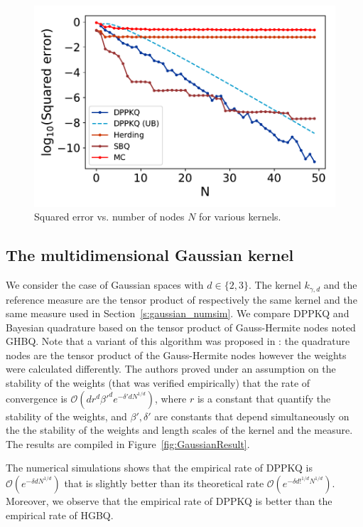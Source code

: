 \documentclass[twoside,11pt]{book}
\numberwithin{theorem}{chapter}
\numberwithin{definition}{chapter}
\numberwithin{proposition}{chapter}
\numberwithin{corollary}{chapter}
\numberwithin{example}{chapter}
\numberwithin{lemma}{chapter}
\numberwithin{assumption}{chapter}
\begin{document}
\begin{figure}
    \centering
\includegraphics[width=\textwidth]{img/neurips/GaussianKernel/Gaussian_kernel_scale_05_a_025_fig_4}
\caption{Squared error vs. number of nodes $N$ for various kernels.
\label{fig:results}}
\end{figure} 


\subsection{The multidimensional Gaussian kernel}\label{s:multigaussian_numsim}

We consider the case of Gaussian spaces with $d \in \{2,3\}$. The kernel $k_{\gamma,d}$ and the reference measure are the tensor product of respectively the same kernel and the same measure used in Section~\ref{s:gaussian_numsim}. We compare DPPKQ and Bayesian quadrature based on the tensor product of Gauss-Hermite nodes noted GHBQ. Note that a variant of this algorithm was proposed in \citep{KaSa19}: the quadrature nodes are the tensor product of the Gauss-Hermite nodes however the weights were calculated differently. The authors proved under an assumption on the stability of the weights (that was verified empirically) that the rate of convergence is $\mathcal{O}(dr^{d}\beta'^{d}e^{-\delta' d N^{1/d}})$, where $r$ is a constant that quantify the stability of the weights, and $\beta',\delta'$ are constants that depend simultaneously on the the stability of the weights and length scales of the kernel and the measure. The results are compiled in Figure~\ref{fig:GaussianResult}.

The numerical simulations shows that the empirical rate of DPPKQ is $\mathcal{O}(e^{-\delta d N^{1/d}})$ that is slightly better than its theoretical rate $\mathcal{O}(e^{-\delta d!^{1/d} N^{1/d}})$. Moreover, we observe that the empirical rate of DPPKQ is better than the empirical rate of HGBQ.
\end{document}
